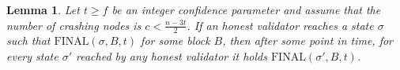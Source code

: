 \documentclass[12pt, fleqn]{article}
\newtheorem{lemma}{Lemma}
\newcommand{\final}{\mathrm{FINAL}}
\begin{document}

\begin{lemma}\label{lemma:final_follow}
Let $t\geq f$ be an integer confidence parameter and assume that the number of crashing nodes is $c< \frac{n-3t}{2}$. If an honest validator reaches a state $\sigma$ such that $\final(\sigma, B, t)$ for some block $B$, then after some point in time, for every state $\sigma'$ reached by any honest validator it holds $\final(\sigma', B, t)$.
\end{lemma}
\end{document}

